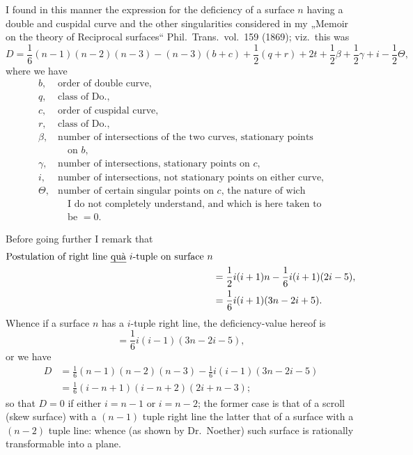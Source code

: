 \documentclass{article}
\begin{document}
I found in this manner the expression for the deficiency of a surface $n$ having a double and cuspidal curve and the other singularities considered in my „Memoir on the theory of Reciprocal surfaces“ Phil.\ Trans.\ vol.\ 159 (1869); viz.\ this was
\[
D = \frac{1}{6}(n - 1)(n - 2)(n - 3) - (n - 3)(b + c) + \frac{1}{2}(q + r) + 2t + \frac{1}{2}\beta + \frac{1}{2}\gamma + i - \frac{1}{2}\Theta,
\]
where we have
\[
\begin{array}{ll}
b, & \text{order of double curve,} \\
q, & \text{class of Do.,} \\
c, & \text{order of cuspidal curve,} \\
r, & \text{class of Do.,} \\
\beta, & \text{number of intersections of the two curves, stationary points} \\
& \quad\text{on } b, \\
\gamma, & \text{number of intersections, stationary points on } c, \\
i, & \text{number of intersections, not stationary points on either curve,} \\
\Theta, & \text{number of certain singular points on } c\text{, the nature of wich} \\
& \quad\text{I do not completely understand, and which is here taken to} \\
& \quad\text{be } = 0.
\end{array}
\]

Before going further I remark that
\[
\begin{aligned}
\text{Postulation of right line \emph{quà} } i\text{-tuple on surface } n & \\
&= \frac{1}{2} i(i + 1)n - \frac{1}{6} i(i + 1)(2i - 5), \\
&= \frac{1}{6} i(i + 1)(3n - 2i + 5).
\end{aligned}
\]
Whence if a surface $n$ has a $i$-tuple right line, the deficiency-value hereof is
\[
= \frac{1}{6} i(i - 1)(3n - 2i - 5),
\]
or we have
\[
\begin{aligned}
D &= \frac{1}{6}(n - 1)(n - 2)(n - 3) - \frac{1}{6} i(i - 1)(3n - 2i - 5) \\
&= \frac{1}{6}(i - n + 1)(i - n + 2)(2i + n - 3);
\end{aligned}
\]
so that $D = 0$ if either $i = n - 1$ or $i = n - 2$; the former case is that of a scroll (skew surface) with a $(n - 1)$ tuple right line the latter that of a surface with a $(n - 2)$ tuple line: whence (as shown by Dr.~Noether) such surface is rationally transformable into a plane.
\end{document}
